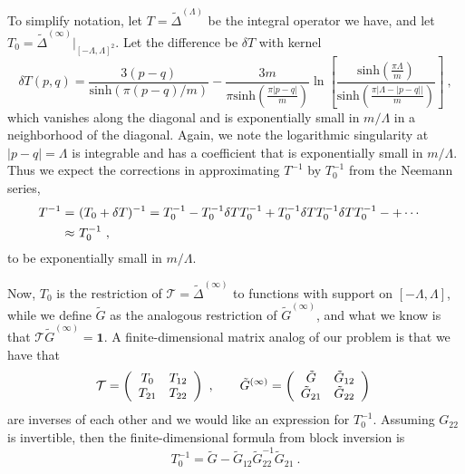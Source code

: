 \def\letter{0}\def\pr{0}\documentclass[a4paper,12pt, epsfig]{article}
\renewcommand{\sinh}{\textrm{sinh}}
\renewcommand{\(}{\begin{equation}}
\renewcommand{\)}{end{equation} \vspace{-.05in}\linebreak}
\renewcommand{\=}{\hspace{-.03in}=\hspace{-.02in}}
\renewcommand{\(}{\begin{equation}}
\renewcommand{\)}{\end{equation}}
\renewcommand{\(}{\begin{equation}}
\renewcommand{\)}{\end{equation}}
\begin{document}
To simplify notation, let $T = \tilde{\Delta}^{(\Lambda)}$ be the integral operator we have, and let $T_0 = \tilde{\Delta}^{(\infty)} |_{[-\Lambda,\Lambda]^2}$.  Let the difference be $\delta T$ with kernel
%
\begin{equation}
\delta T(p,q) = \frac{3(p-q)}{\sinh(\pi (p-q)/m)} - \frac{3m}{\pi \sinh(\frac{\pi |p-q|}{m})} \ln \left[ \frac{\sinh(\frac{\pi \Lambda}{m})}{\sinh(\frac{\pi |\Lambda - |p-q||}{m})} \right] ~,
\end{equation}
%
which vanishes along the diagonal and is exponentially small in $m/\Lambda$ in a neighborhood of the diagonal.  Again, we note the logarithmic singularity at $|p-q| = \Lambda$ is integrable and has a coefficient that is exponentially small in $m/\Lambda$.  Thus we expect the corrections in approximating $T^{-1}$ by $T_{0}^{-1}$ from the Neemann series,
%
\begin{align}\label{TvsT0}
T^{-1} =&~ (T_0 + \delta T)^{-1} = T_{0}^{-1} - T_{0}^{-1} \delta T T_{0}^{-1} + T_{0}^{-1} \delta T T_{0}^{-1} \delta T T_{0}^{-1} - + \cdots \cr
\approx &~ T_{0}^{-1} ~,
\end{align}
%
to be exponentially small in $m/\Lambda$.

Now, $T_0$ is the restriction of $\mathcal{T} = \tilde{\Delta}^{(\infty)}$ to functions with support on $[-\Lambda,\Lambda]$, while we define $\tilde{G}$ as the analogous restriction of $\tilde{G}^{(\infty)}$, and what we know is that $\mathcal{T} \tilde{G}^{(\infty)} = \mathbf{1}$.  A finite-dimensional matrix analog of our problem is that we have that
%
\begin{equation}
\mathcal{T} = \left( \begin{array}{c c} T_0 & T_{12} \\ T_{21} & T_{22} \end{array} \right) ~, \qquad \tilde{G}^{(\infty)} = \left( \begin{array}{c c} \tilde{G} & \tilde{G}_{12} \\ \tilde{G}_{21} & \tilde{G}_{22} \end{array} \right)~
\end{equation}
%
are inverses of each other and we would like an expression for $T_{0}^{-1}$.  Assuming $G_{22}$ is invertible, then the finite-dimensional formula from block inversion is
%
\begin{equation}\label{T0toG}
T_{0}^{-1} = \tilde{G} - \tilde{G}_{12} \tilde{G}_{22}^{-1} \tilde{G}_{21}~.
\end{equation}
%
\end{document}
